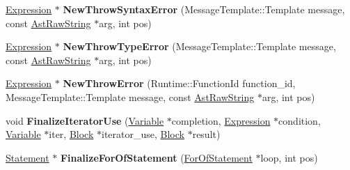 \begin{DoxyCompactItemize}
\item 
\hyperlink{classv8_1_1internal_1_1_expression}{Expression} $\ast$ {\bfseries New\+Throw\+Syntax\+Error} (Message\+Template\+::\+Template message, const \hyperlink{classv8_1_1internal_1_1_ast_raw_string}{Ast\+Raw\+String} $\ast$arg, int pos)\hypertarget{classv8_1_1internal_1_1_parser_traits_a7b1e91b8852862c462d69b25573290ec}{}\label{classv8_1_1internal_1_1_parser_traits_a7b1e91b8852862c462d69b25573290ec}

\item 
\hyperlink{classv8_1_1internal_1_1_expression}{Expression} $\ast$ {\bfseries New\+Throw\+Type\+Error} (Message\+Template\+::\+Template message, const \hyperlink{classv8_1_1internal_1_1_ast_raw_string}{Ast\+Raw\+String} $\ast$arg, int pos)\hypertarget{classv8_1_1internal_1_1_parser_traits_a3d28b5ebe3496f523a2c86d03e337cfa}{}\label{classv8_1_1internal_1_1_parser_traits_a3d28b5ebe3496f523a2c86d03e337cfa}

\item 
\hyperlink{classv8_1_1internal_1_1_expression}{Expression} $\ast$ {\bfseries New\+Throw\+Error} (Runtime\+::\+Function\+Id function\+\_\+id, Message\+Template\+::\+Template message, const \hyperlink{classv8_1_1internal_1_1_ast_raw_string}{Ast\+Raw\+String} $\ast$arg, int pos)\hypertarget{classv8_1_1internal_1_1_parser_traits_ae77da3551545aa3d092bdfea64812e0c}{}\label{classv8_1_1internal_1_1_parser_traits_ae77da3551545aa3d092bdfea64812e0c}

\item 
void {\bfseries Finalize\+Iterator\+Use} (\hyperlink{classv8_1_1internal_1_1_variable}{Variable} $\ast$completion, \hyperlink{classv8_1_1internal_1_1_expression}{Expression} $\ast$condition, \hyperlink{classv8_1_1internal_1_1_variable}{Variable} $\ast$iter, \hyperlink{classv8_1_1internal_1_1_block}{Block} $\ast$iterator\+\_\+use, \hyperlink{classv8_1_1internal_1_1_block}{Block} $\ast$result)\hypertarget{classv8_1_1internal_1_1_parser_traits_aad0a6cc956eb927cc3912f6c08ddb541}{}\label{classv8_1_1internal_1_1_parser_traits_aad0a6cc956eb927cc3912f6c08ddb541}

\item 
\hyperlink{classv8_1_1internal_1_1_statement}{Statement} $\ast$ {\bfseries Finalize\+For\+Of\+Statement} (\hyperlink{classv8_1_1internal_1_1_for_of_statement}{For\+Of\+Statement} $\ast$loop, int pos)\hypertarget{classv8_1_1internal_1_1_parser_traits_aa74cbc57020cb7845e09d8c92cb4239d}{}\label{classv8_1_1internal_1_1_parser_traits_aa74cbc57020cb7845e09d8c92cb4239d}


\end{DoxyCompactItemize}
